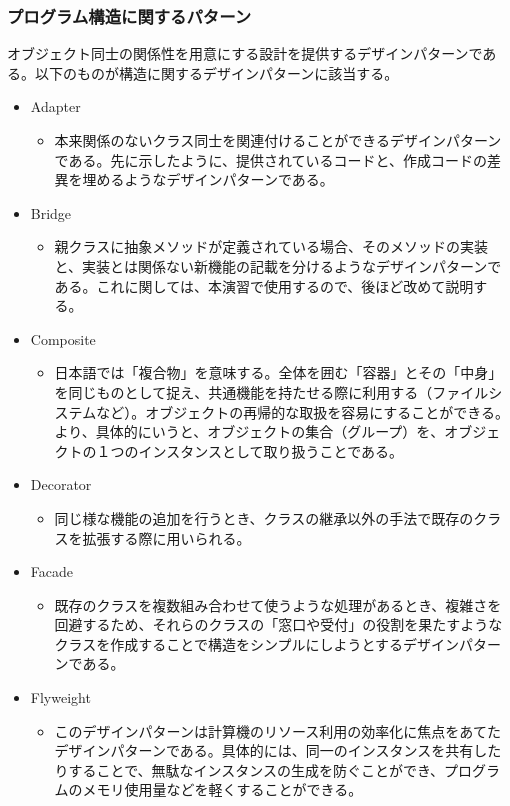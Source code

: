 \documentclass[dvipdfmx]{jsarticle}
\begin{document}
\subsubsection{プログラム構造に関するパターン}
オブジェクト同士の関係性を用意にする設計を提供するデザインパターンである。以下のものが構造に関するデザインパターンに該当する。
\begin{itemize}
  \item Adapter
  \begin{itemize}
    \item 本来関係のないクラス同士を関連付けることができるデザインパターンである。先に示したように、提供されているコードと、作成コードの差異を埋めるようなデザインパターンである。
  \end{itemize}
  \item Bridge
  \begin{itemize}
    \item 親クラスに抽象メソッドが定義されている場合、そのメソッドの実装と、実装とは関係ない新機能の記載を分けるようなデザインパターンである。これに関しては、本演習で使用するので、後ほど改めて説明する。
  \end{itemize}
  \item Composite
    \begin{itemize}
      \item 日本語では「複合物」を意味する。全体を囲む「容器」とその「中身」を同じものとして捉え、共通機能を持たせる際に利用する（ファイルシステムなど）。オブジェクトの再帰的な取扱を容易にすることができる。より、具体的にいうと、オブジェクトの集合（グループ）を、オブジェクトの１つのインスタンスとして取り扱うことである。
    \end{itemize}
  \item Decorator
  \begin{itemize}
    \item 同じ様な機能の追加を行うとき、クラスの継承以外の手法で既存のクラスを拡張する際に用いられる。
  \end{itemize}
  \item Facade
  \begin{itemize}
    \item 既存のクラスを複数組み合わせて使うような処理があるとき、複雑さを回避するため、それらのクラスの「窓口や受付」の役割を果たすようなクラスを作成することで構造をシンプルにしようとするデザインパターンである。
  \end{itemize}
  \item Flyweight
  \begin{itemize}
    \item このデザインパターンは計算機のリソース利用の効率化に焦点をあてたデザインパターンである。具体的には、同一のインスタンスを共有したりすることで、無駄なインスタンスの生成を防ぐことができ、プログラムのメモリ使用量などを軽くすることができる。

\end{itemize}
\end{itemize}
\end{document}
